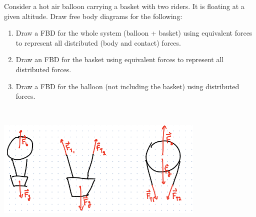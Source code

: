 Consider a hot air balloon carrying a basket with two riders. It is floating at a given altitude. Draw free body diagrams for the following:

\begin{enumerate}
    \item Draw a FBD for the whole system (balloon + basket) using equivalent forces to represent all distributed (body and contact) forces.
    \item Draw an FBD for the basket using equivalent forces to represent all distributed forces.
    \item Draw a FBD for the balloon (not including the basket) using distributed forces.
\end{enumerate}

\begin{solution}\
\begin{center}
    \includegraphics[width=0.75\textwidth]{img/e7p2.png}
\end{center}
\end{solution}